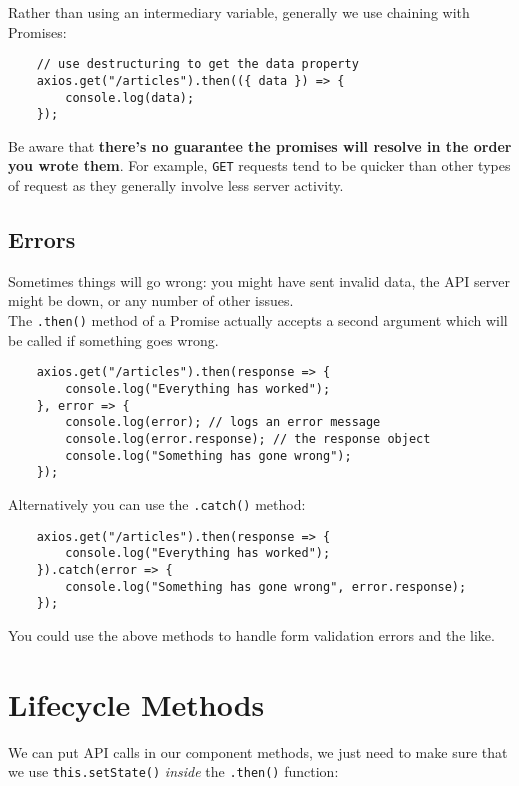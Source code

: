 Rather than using an intermediary variable, generally we use chaining with Promises:

\begin{verbatim}
    // use destructuring to get the data property
    axios.get("/articles").then(({ data }) => {
        console.log(data);
    });
\end{verbatim}

Be aware that \textbf{there's no guarantee the promises will resolve in the order you wrote them}. For example, \texttt{GET} requests tend to be quicker than other types of request as they generally involve less server activity.


\subsection{Errors}

Sometimes things will go wrong: you might have sent invalid data, the API server might be down, or any number of other issues.
\\

The \texttt{.then()} method of a Promise actually accepts a second argument which will be called if something goes wrong.

\begin{verbatim}
    axios.get("/articles").then(response => {
        console.log("Everything has worked");
    }, error => {
        console.log(error); // logs an error message
        console.log(error.response); // the response object
        console.log("Something has gone wrong");
    });
\end{verbatim}

Alternatively you can use the \texttt{.catch()} method:

\begin{verbatim}
    axios.get("/articles").then(response => {
        console.log("Everything has worked");
    }).catch(error => {
        console.log("Something has gone wrong", error.response);
    });
\end{verbatim}

You could use the above methods to handle form validation errors and the like.


\section{Lifecycle Methods}

We can put API calls in our component methods, we just need to make sure that we use \texttt{this.setState()} \textit{inside} the \texttt{.then()} function:

